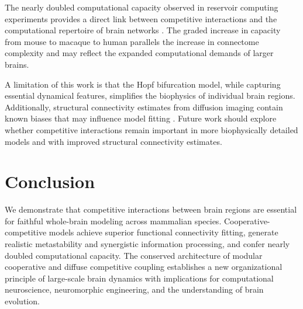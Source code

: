 \documentclass[11pt]{article}
\begin{document}
The nearly doubled computational capacity observed in reservoir computing experiments provides a direct link between competitive interactions and the computational repertoire of brain networks \citep{jaeger2004harnessing, suarez2021learning}. The graded increase in capacity from mouse to macaque to human parallels the increase in connectome complexity and may reflect the expanded computational demands of larger brains.

A limitation of this work is that the Hopf bifurcation model, while capturing essential dynamical features, simplifies the biophysics of individual brain regions. Additionally, structural connectivity estimates from diffusion imaging contain known biases that may influence model fitting \citep{maier2017challenge}. Future work should explore whether competitive interactions remain important in more biophysically detailed models and with improved structural connectivity estimates.

\section{Conclusion}

We demonstrate that competitive interactions between brain regions are essential for faithful whole-brain modeling across mammalian species. Cooperative-competitive models achieve superior functional connectivity fitting, generate realistic metastability and synergistic information processing, and confer nearly doubled computational capacity. The conserved architecture of modular cooperative and diffuse competitive coupling establishes a new organizational principle of large-scale brain dynamics with implications for computational neuroscience, neuromorphic engineering, and the understanding of brain evolution.



\end{document}
